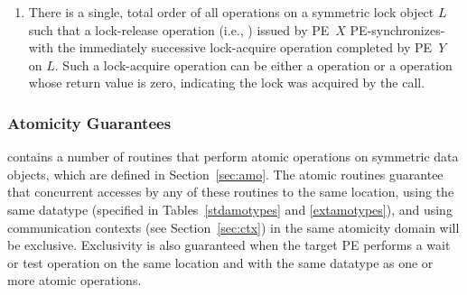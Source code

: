 \begin{enumerate}

\item There is a single, total order of all operations on a symmetric
  lock object $L$ such that a lock-release operation (i.e.,
  ) issued by \ac{PE}~$X$
  \ac{PE}-synchronizes-with the immediately successive lock-acquire
  operation completed by \ac{PE}~$Y$ on $L$.  Such a lock-acquire
  operation can be either a  operation or a
   operation whose return value is zero,
  indicating the lock was acquired by the call.

\end{enumerate}

\subsubsection{Atomicity Guarantees}\label{subsec:amo_guarantees}

\openshmem contains a number of routines that perform atomic operations on
symmetric data objects, which are defined in Section~\ref{sec:amo}.
The atomic routines
guarantee that concurrent accesses by any of these routines to the same
location, using the same datatype (specified in Tables~\ref{stdamotypes} and
\ref{extamotypes}), and using communication contexts (see Section~\ref{sec:ctx})
in the same atomicity domain will be exclusive.
Exclusivity is also guaranteed when the target \ac{PE} performs a wait or test
operation on the same location and with the same datatype as one or more atomic
operations.

